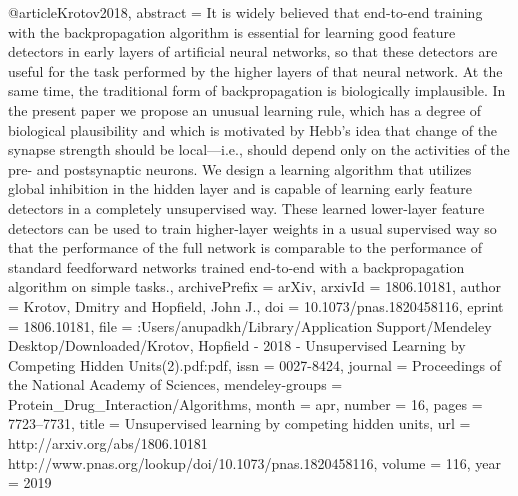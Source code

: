 @article{Krotov2018,
abstract = {It is widely believed that end-to-end training with the backpropagation algorithm is essential for learning good feature detectors in early layers of artificial neural networks, so that these detectors are useful for the task performed by the higher layers of that neural network. At the same time, the traditional form of backpropagation is biologically implausible. In the present paper we propose an unusual learning rule, which has a degree of biological plausibility and which is motivated by Hebb's idea that change of the synapse strength should be local—i.e., should depend only on the activities of the pre- and postsynaptic neurons. We design a learning algorithm that utilizes global inhibition in the hidden layer and is capable of learning early feature detectors in a completely unsupervised way. These learned lower-layer feature detectors can be used to train higher-layer weights in a usual supervised way so that the performance of the full network is comparable to the performance of standard feedforward networks trained end-to-end with a backpropagation algorithm on simple tasks.},
archivePrefix = {arXiv},
arxivId = {1806.10181},
author = {Krotov, Dmitry and Hopfield, John J.},
doi = {10.1073/pnas.1820458116},
eprint = {1806.10181},
file = {:Users/anupadkh/Library/Application Support/Mendeley Desktop/Downloaded/Krotov, Hopfield - 2018 - Unsupervised Learning by Competing Hidden Units(2).pdf:pdf},
issn = {0027-8424},
journal = {Proceedings of the National Academy of Sciences},
mendeley-groups = {Protein{\_}Drug{\_}Interaction/Algorithms},
month = {apr},
number = {16},
pages = {7723--7731},
title = {{Unsupervised learning by competing hidden units}},
url = {http://arxiv.org/abs/1806.10181 http://www.pnas.org/lookup/doi/10.1073/pnas.1820458116},
volume = {116},
year = {2019}
}
